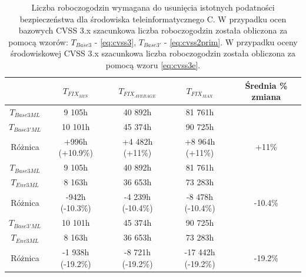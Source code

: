 \begin{table}[tbh]
\caption{Liczba roboczogodzin wymagana do usunięcia istotnych podatności bezpieczeństwa dla środowiska teleinformatycznego C. W przypadku ocen bazowych CVSS 3.x szacunkowa liczba roboczogodzin została obliczona za pomocą wzorów: $T_{Base3}$ - \ref{eq:cvss3}, $T_{Base3'}$ - \ref{eq:cvss2prim}. W przypadku oceny środowiskowej CVSS 3.x szacunkowa liczba roboczogodzin została obliczona za pomocą wzoru \ref{eq:cvss3e}.}
\begin{center}
\label{tab:chapter6:env_c:time_results_cvss3}
\begin{tabular}{c|ccc|c}
\hline
                 & \textbf{$T_{FIX_{MIN}}$} & \textbf{$T_{FIX_{AVERAGE}}$} & \textbf{$T_{FIX_{MAX}}$ }  & Średnia \% zmiana \\
\hline
$T_{Base3ML}$    &                        9 105h &           40 892h &    81 761h         &         \\
$T_{Base3'ML}$&                          10 101h &           45 374h &    90 725h         &         \\
Różnica          &               +996h (+10.9\%) &   +4 482h (+11\%) & +8 964h (+11\%) & +11\% \\  
\hline
$T_{Base3ML}$    &                     9 105h &            40 892h &    81 761h         &         \\
$T_{Env3ML}$     &                     8 163h &            36 653h &    73 283h        &         \\
Różnica          &               -942h (-10.3\%)  &  -4 239h (-10.4\%) & -8 478h (-10.4\%) & -10.4\% \\  
\hline
$T_{Base3'ML}$   &                      10 101h &          45 374h &    90 725h         &         \\
$T_{Env3ML}$     &                      8 163h &           36 653h &    73 283h        &         \\
Różnica          &                -1 938h (-19.2\%) & -8 721h (-19.2\%) & -17 442h (-19.2\%) & -19.2\% \\  
\hline
\end{tabular}
\end{center}
\end{table}


